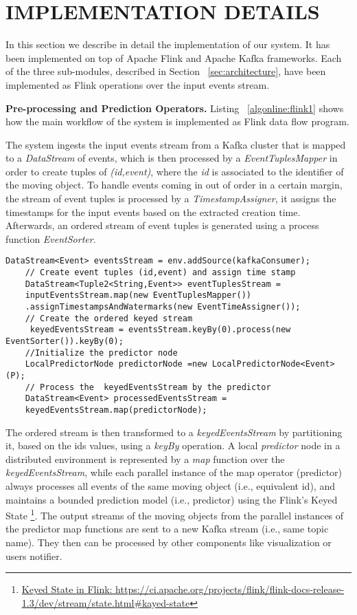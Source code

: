 

\section{IMPLEMENTATION DETAILS}
\label{sec:impl}
In this section we describe in detail the implementation of our system. It has been implemented on top of Apache Flink and Apache Kafka frameworks. Each of the three sub-modules, described in Section ~\ref{sec:architecture}, have been implemented as Flink operations over the input events stream. 

\textbf{Pre-processing and Prediction Operators.} Listing ~\ref{algonline:flink1} shows how the main workflow of the system is implemented as Flink data flow program.

The system ingests the input events stream from a Kafka cluster that is mapped to a \textit{DataStream} of events, which is then processed by a \textit{EventTuplesMapper} in order to create tuples of \textit{(id,event)}, where the \textit{id} is associated to the identifier of the moving object. To handle events  coming in out of order in a certain margin, the stream of event tuples  is processed by a \textit{TimestampAssigner}, it assigns the timestamps for the input events based on the extracted creation time. Afterwards,  an ordered stream of event tuples is generated using a process function \textit{EventSorter}.

	\begin{lstlisting}[caption={Flink pipeline for local predictors workflow},label={algonline:flink1},frame=single]
	DataStream<Event> eventsStream = env.addSource(kafkaConsumer);	
	// Create event tuples (id,event) and assign time stamp 
	DataStream<Tuple2<String,Event>> eventTuplesStream =
	inputEventsStream.map(new EventTuplesMapper())
	.assignTimestampsAndWatermarks(new EventTimeAssigner());	
	// Create the ordered keyed stream 
	 keyedEventsStream = eventsStream.keyBy(0).process(new EventSorter()).keyBy(0);	
	//Initialize the predictor node 
	LocalPredictorNode predictorNode =new LocalPredictorNode<Event>(P);
	// Process the  keyedEventsStream by the predictor 
	DataStream<Event> processedEventsStream =
	keyedEventsStream.map(predictorNode);
	\end{lstlisting}
	
 The ordered stream is then transformed to a \textit{keyedEventsStream} by partitioning it, based on the ids values, using a \textit{keyBy} operation. A local \textit{predictor} node in a distributed environment is represented by a \textit{map} function over the \textit{keyedEventsStream}, while each parallel instance of the map operator (predictor) always processes all events of the same moving object (i.e., equivalent id), and maintains a bounded prediction model (i.e., \pmcmr predictor) using the Flink's Keyed State  \footnote{\url{Keyed State in Flink: https://ci.apache.org/projects/flink/flink-docs-release-1.3/dev/stream/state.html\#kayed-state}}.  The output streams of the moving objects from the parallel instances of the predictor map functions are sent to a new Kafka stream (i.e., same topic name).  They then can be processed by other components like visualization or users notifier.


